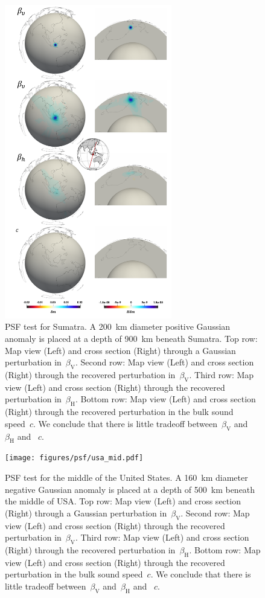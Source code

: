 \documentclass[extra,mreferee]{gji}
\begin{document}
\begin{figure}
  \centering
  \includegraphics[width=0.65\textwidth]{figures/psf/su.pdf}
  \caption{\small{PSF test for Sumatra.
    A 200~km diameter positive Gaussian anomaly is placed at a depth of 900~km beneath Sumatra.
  Top row: Map view (Left) and cross section (Right) through a Gaussian perturbation in~$\beta_\mathrm{V}$.
  Second row: Map view (Left) and cross section (Right) through the recovered perturbation in~$\beta_\mathrm{V}$.
  Third row: Map view (Left) and cross section (Right) through the recovered perturbation in~$\beta_\mathrm{H}$.
  Bottom row: Map view (Left) and cross section (Right) through the recovered perturbation in the bulk sound speed~$c$. We conclude that there is little tradeoff between~$\beta_\mathrm{V}$ and~$\beta_\mathrm{H}$ and ~$c$.
  }}
  \label{fig:psf_su}
\end{figure}

\begin{figure}
  \centering
  \texttt{[image: figures/psf/usa\_mid.pdf]}
  \caption{\small{PSF test for the middle of the United States.
    A 160~km diameter negative Gaussian anomaly is placed at a depth of 500~km beneath the middle of USA.
  Top row: Map view (Left) and cross section (Right) through a Gaussian perturbation in~$\beta_\mathrm{V}$.
  Second row: Map view (Left) and cross section (Right) through the recovered perturbation in~$\beta_\mathrm{V}$.
  Third row: Map view (Left) and cross section (Right) through the recovered perturbation in~$\beta_\mathrm{H}$.
  Bottom row: Map view (Left) and cross section (Right) through the recovered perturbation in the bulk sound speed~$c$. We conclude that there is little tradeoff between~$\beta_\mathrm{V}$ and~$\beta_\mathrm{H}$ and ~$c$.
  }}
  \label{fig:psf_usa_mid}
\end{figure}
\end{document}

